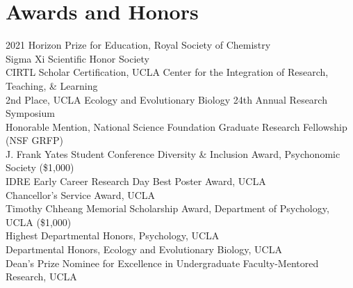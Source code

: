 \section*{Awards and Honors}
2021 Horizon Prize for Education, Royal Society of Chemistry\\
Sigma Xi Scientific Honor Society\\
CIRTL Scholar Certification, UCLA Center for the Integration of Research, Teaching, \& Learning\\
2nd Place, UCLA Ecology and Evolutionary Biology 24th Annual Research Symposium\\
Honorable Mention, National Science Foundation Graduate Research Fellowship (NSF GRFP)\\
J. Frank Yates Student Conference Diversity \& Inclusion Award, Psychonomic Society (\$1,000)\\
IDRE Early Career Research Day Best Poster Award, UCLA\\
Chancellor's Service Award, UCLA\\
Timothy Chheang Memorial Scholarship Award, Department of Psychology, UCLA (\$1,000)\\
Highest Departmental Honors, Psychology, UCLA\\
Departmental Honors, Ecology and Evolutionary Biology, UCLA\\
Dean's Prize Nominee for Excellence in Undergraduate Faculty-Mentored Research, UCLA
